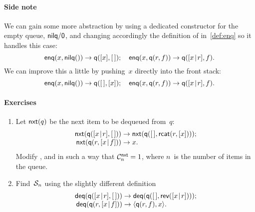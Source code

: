 \paragraph{Side note}

We can gain some more abstraction by using a dedicated constructor for
the empty queue, \(\fun{nilq/0}\), and changing accordingly the
definition of  in~\eqref{def:enq}  so it
handles this case:
\begin{equation*}
\fun{enq}(x,\fun{nilq}()) \rightarrow \fun{q}([x],\el);
\quad
\fun{enq}(x,\fun{q}(r,f)) \rightarrow \fun{q}(\cons{x}{r},f).
\end{equation*}
We can improve this a little by pushing~\(x\) directly into the front
stack:
\begin{equation*}
\fun{enq}(x,\fun{nilq}()) \rightarrow \fun{q}(\el,[x]);
\quad
\fun{enq}(x,\fun{q}(r,f)) \rightarrow \fun{q}(\cons{x}{r},f).
\end{equation*}

\paragraph{Exercises}
\begin{enumerate}

  \item Let \(\fun{nxt}(q)\) be the next item
    to be dequeued from~\(q\):
    \begin{equation*}
      \begin{array}{r@{\;}l@{\;}l}
        \fun{nxt}(\fun{q}(\cons{x}{r},\el)) & \rightarrow 
        & \fun{nxt}(\fun{q}(\el,\fun{rcat}(r,[x])));\\
        \fun{nxt}(\fun{q}(r,\cons{x}{f})) & \rightarrow & x.     
        \index{q@\fun{q/2}}
      \end{array}
    \end{equation*}
    Modify ,
     and
     in such a way that
    \(\C{\fun{nxt}}{n} = 1\), where
    \(n\)~is the number of items in the queue.

    \item Find~\(\A{n}\) using the slightly different definition
      \begin{equation*}
        \begin{array}{@{}r@{\;}l@{\;}l@{}}
          \fun{deq}(\fun{q}(\cons{x}{r},\el))
          & \rightarrow
          & \fun{deq}(\fun{q}(\el,\fun{rev}(\cons{x}{r})));\\
          \fun{deq}(\fun{q}(r,\cons{x}{f}))
          & \rightarrow
          & \pair{\fun{q}(r,f)}{x}.
        \end{array}
      \end{equation*}

\end{enumerate}

